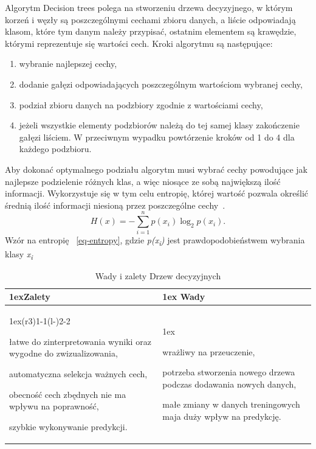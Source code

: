Algorytm Decision trees polega na stworzeniu drzewa decyzyjnego, w którym korzeń i węzły
są poszczególnymi cechami zbioru danych, a liście odpowiadają klasom, które tym danym 
należy przypisać, ostatnim elementem są krawędzie, którymi reprezentuje się wartości cech. 
Kroki algorytmu są następujące:
\begin{enumerate}
    \item wybranie najlepszej cechy,
    \item dodanie gałęzi odpowiadających poszczególnym wartościom wybranej cechy,
    \item podział zbioru danych na podzbiory zgodnie z wartościami cechy,
    \item jeżeli wszystkie elementy podzbiorów należą do tej samej klasy 
    zakończenie gałęzi liściem. W przeciwnym wypadku powtórzenie kroków 
    od 1 do 4 dla każdego podzbioru.
\end{enumerate}
Aby dokonać optymalnego podziału algorytm musi wybrać cechy powodujące jak najlepsze
podzielenie różnych klas, a więc niosące ze sobą największą ilość informacji.
Wykorzystuje się w tym celu entropię, której wartość pozwala określić średnią ilość 
informacji niesioną przez poszczególne cechy~\cite{MLAlgorithms}.
\begin{equation}
    H(x)=-\sum_{i=1}^n p(x_i) \log_2 p(x_i).
    \label{eq-entropy}
\end{equation}
Wzór na entropię ~\ref{eq-entropy}, gdzie \textit{p(x\textsubscript{i})} jest prawdopodobieństwem
wybrania klasy \textit{x\textsubscript{i}}
\begin{table}[h]
    \begin{tabularx}{\linewidth}{>{\parskip1ex}X@{\kern4\tabcolsep}>{\parskip1ex}X}
    \toprule
    \hfil\bfseries Zalety
    &
    \hfil\bfseries Wady
    \\\cmidrule(r{3\tabcolsep}){1-1}\cmidrule(l{-\tabcolsep}){2-2}
    
    łatwe do zinterpretowania wyniki oraz wygodne do zwizualizowania,\par
    automatyczna selekcja ważnych cech,\par 
    obecność cech zbędnych nie ma wpływu na poprawność,\par
    szybkie wykonywanie predykcji.\par
    &
    
    wrażliwy na przeuczenie,\par
    potrzeba stworzenia nowego drzewa podczas dodawania nowych danych,\par
    małe zmiany w danych treningowych maja duży wpływ na predykcję.\par
    
    \\\bottomrule
    \end{tabularx}
    \caption{Wady i zalety Drzew decyzyjnych}
\end{table}

